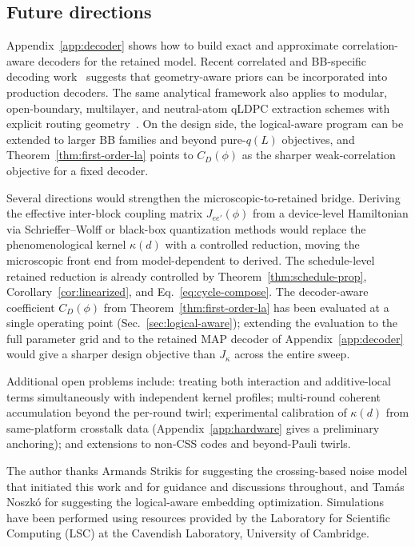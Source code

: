 \documentclass[
aps,
prx,
10pt,
twocolumn,
groupedaddress,
longbibliography,
nofootinbib,
floatfix
]{revtex4-2}
\theoremstyle{definition}
\begin{document}
\subsection{Future directions}

Appendix~\ref{app:decoder} shows how to build exact and approximate correlation-aware decoders for the retained model. Recent correlated and BB-specific decoding work~\cite{maan_correlated_2026,sahay_matching_2026} suggests that geometry-aware priors can be incorporated into production decoders. The same analytical framework also applies to modular, open-boundary, multilayer, and neutral-atom qLDPC extraction schemes with explicit routing geometry~\cite{strikis_berent_2023,liang_openboundaries_2025,mathews_multilayer_2025,poole_rydberg_2025}. On the design side, the logical-aware program can be extended to larger BB families and beyond pure-$q(L)$ objectives, and Theorem~\ref{thm:first-order-la} points to $C_D(\phi)$ as the sharper weak-correlation objective for a fixed decoder.

Several directions would strengthen the microscopic-to-retained bridge. Deriving the effective inter-block coupling matrix $J_{ee'}(\phi)$ from a device-level Hamiltonian via Schrieffer--Wolff or black-box quantization methods would replace the phenomenological kernel $\kappa(d)$ with a controlled reduction, moving the microscopic front end from model-dependent to derived. The schedule-level retained reduction is already controlled by Theorem~\ref{thm:schedule-prop}, Corollary~\ref{cor:linearized}, and Eq.~\eqref{eq:cycle-compose}. The decoder-aware coefficient $C_D(\phi)$ from Theorem~\ref{thm:first-order-la} has been evaluated at a single operating point (Sec.~\ref{sec:logical-aware}); extending the evaluation to the full parameter grid and to the retained MAP decoder of Appendix~\ref{app:decoder} would give a sharper design objective than $J_\kappa$ across the entire sweep.

Additional open problems include: treating both interaction and additive-local terms simultaneously with independent kernel profiles; multi-round coherent accumulation beyond the per-round twirl; experimental calibration of $\kappa(d)$ from same-platform crosstalk data (Appendix~\ref{app:hardware} gives a preliminary anchoring); and extensions to non-CSS codes and beyond-Pauli twirls.

\begin{acknowledgments}
The author thanks Armands Strikis for suggesting the crossing-based noise model that initiated this work and for guidance and discussions throughout, and Tam\'as Noszk\'o for suggesting the logical-aware embedding optimization. Simulations have been performed using resources provided by the Laboratory for Scientific Computing (LSC) at the Cavendish Laboratory, University of Cambridge.
\end{acknowledgments}
\end{document}
